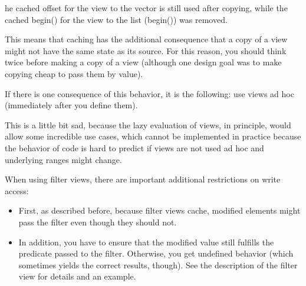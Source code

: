 he cached offset for the view to the vector is still used after copying, while the cached begin() for the view to the list (begin()) was removed.

This means that caching has the additional consequence that a copy of a view might not have the same state as its source. For this reason, you should think twice before making a copy of a view (although one design goal was to make copying cheap to pass them by value).

If there is one consequence of this behavior, it is the following: use views ad hoc (immediately after you define them).

This is a little bit sad, because the lazy evaluation of views, in principle, would allow some incredible use cases, which cannot be implemented in practice because the behavior of code is hard to predict if views are not used ad hoc and underlying ranges might change.


When using filter views, there are important additional restrictions on write access:

\begin{itemize}
\item
First, as described before, because filter views cache, modified elements might pass the filter even though they should not.

\item
In addition, you have to ensure that the modified value still fulfills the predicate passed to the filter. Otherwise, you get undefined behavior (which sometimes yields the correct results, though). See the description of the filter view for details and an example.
\end{itemize}

